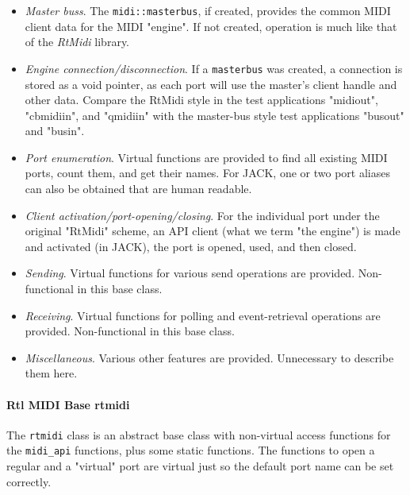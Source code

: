 \begin{itemize}
         input buffer, and some boolean flags.
         These handles are void pointers to API data or user data.
         The functions handling these pointers
         must assume the correct data type.
         Callers can optionally provide a callback function to handle
         MIDI input.
      \item \textsl{Master buss}.
         The \texttt{midi::masterbus}, if created, provides the common MIDI
         client data for the MIDI "engine".
         If not created, operation is much like that of the \textsl{RtMidi}
         library.
      \item \textsl{Engine connection/disconnection}.
         If a \texttt{masterbus} was created, a connection is stored as
         a void pointer, as each port will use the master's client handle
         and other data.
         Compare the RtMidi style in the test applications
         "midiout", "cbmidiin", and "qmidiin" with the master-bus style
         test applications "busout" and "busin".
      \item \textsl{Port enumeration}.
         Virtual functions are provided to find all existing MIDI ports, count
         them, and get their names.
         For JACK, one or two port aliases can also be obtained that
         are human readable.
      \item \textsl{Client activation/port-opening/closing}.
         For the individual port under the original "RtMidi" scheme,
         an API client (what we term "the engine") is made and activated
         (in JACK), the port is opened, used, and then closed.
      \item \textsl{Sending}.
         Virtual functions for various send operations are provided.
         Non-functional in this base class.
      \item \textsl{Receiving}.
         Virtual functions for polling and event-retrieval
         operations are provided.
         Non-functional in this base class.
      \item \textsl{Miscellaneous}.
         Various other features are provided.
         Unnecessary to describe them here.
   \end{itemize}

\paragraph{Rtl MIDI Base rtmidi}
\label{paragraph:rtl_midi_rtmidi}

   The \texttt{rtmidi} class is an abstract base class with non-virtual access
   functions for the \texttt{midi\_api} functions, plus some
   static functions.
   The functions to open a regular and a "virtual" port are virtual
   just so the default port name can be set correctly.

